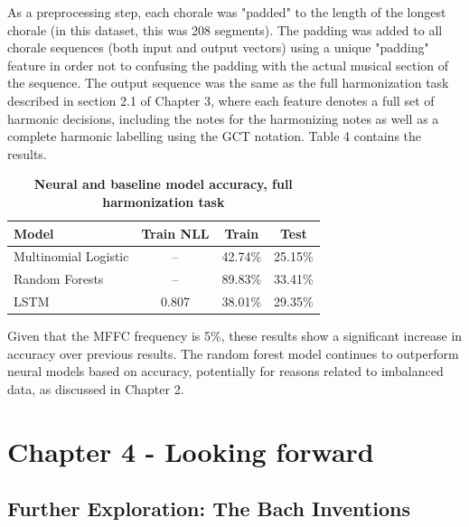 \documentclass[11pt]{article}
\begin{document}
As a preprocessing step, each chorale was "padded" to the length of the longest chorale (in this dataset, this was 208 segments). The padding was added to all chorale sequences (both input and output vectors) using a unique "padding" feature in order not to confusing the padding with the actual musical section of the sequence. The output sequence was the same as the full harmonization task described in section 2.1 of Chapter 3, where each feature denotes a full set of harmonic decisions, including the notes for the harmonizing notes as well as a complete harmonic labelling using the GCT notation. Table 4 contains the results.

\begin{table}[h]
\begin{center}
\caption[Table caption text]{\textbf{Neural and baseline model accuracy, full harmonization task}}
\begin{tabular}{l c c c }
Model & Train NLL & Train & Test \\ \hline
Multinomial Logistic & -- & 42.74\% & 25.15\% \\
Random Forests & -- & 89.83\% & 33.41\% \\ \hline
LSTM & 0.807 & 38.01\% & 29.35\%
\end{tabular}
\end{center}
\end{table}

Given that the MFFC frequency is 5\%, these results show a significant increase in accuracy over previous results. The random forest model continues to outperform neural models based on accuracy, potentially for reasons related to imbalanced data, as discussed in Chapter 2. 

\newpage

\section{Chapter 4 - Looking forward}

\subsection{Further Exploration: The Bach Inventions}
\end{document}
